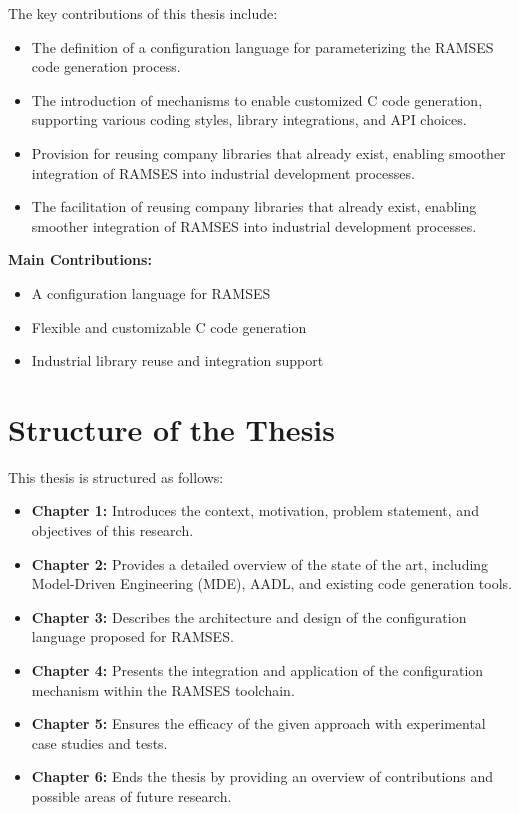 The key contributions of this thesis include:
\begin{itemize}
	\item The definition of a configuration language for parameterizing the RAMSES code generation process.
	\item The introduction of mechanisms to enable customized C code generation, supporting various coding styles, library integrations, and API choices.
	\item Provision for reusing company libraries that already exist, enabling smoother integration of RAMSES into industrial development processes.
	\item The facilitation of reusing company libraries that already exist, enabling smoother integration of RAMSES into industrial development processes.
\end{itemize}

\begin{tcolorbox}[colback=blue!5]
	\textbf{Main Contributions:}
	\begin{itemize}
		\item A configuration language for RAMSES
		\item Flexible and customizable C code generation
		\item Industrial library reuse and integration support
	\end{itemize}
\end{tcolorbox}



\section{Structure of the Thesis}

This thesis is structured as follows:

\begin{itemize}
	\item \textbf{Chapter 1:} Introduces the context, motivation, problem statement, and objectives of this research.
	\item \textbf{Chapter 2:} Provides a detailed overview of the state of the art, including Model-Driven Engineering (MDE), AADL, and existing code generation tools.
	\item \textbf{Chapter 3:} Describes the architecture and design of the configuration language proposed for RAMSES.
	\item \textbf{Chapter 4:} Presents the integration and application of the configuration mechanism within the RAMSES toolchain.
	\item \textbf{Chapter 5:} Ensures the efficacy of the given approach with experimental case studies and tests.
	\item \textbf{Chapter 6:} Ends the thesis by providing an overview of contributions and possible areas of future research.
\end{itemize}










